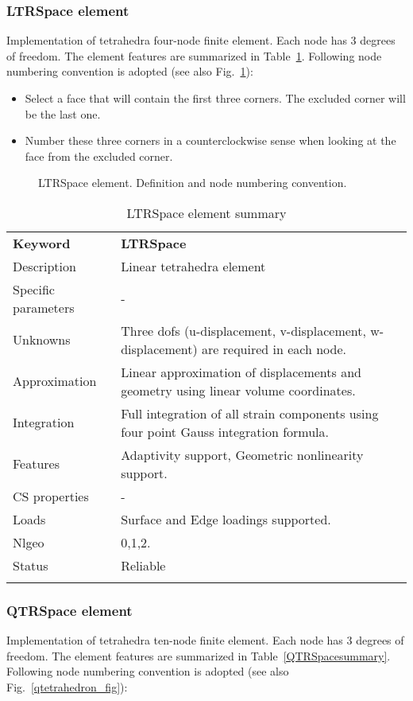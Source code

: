 \documentclass[a4paper]{article}
\newcommand{\param}[1]{\texttt{#1}} %
\newcommand{\templabel}{}%
\newcommand{\tempcaption}{}%
\newcounter{nelpar}
\newenvironment{elementsummary}[5]{%
  \gdef\tempcaption{#4}%
  \gdef\templabel{#5}%
  \setcounter{nelpar}{0}%
  \begin{center} %
    \begin{table}[!htb] %
      \begin{tabular}{|l|p{9cm}|}\hline %
        {\bf Keyword} & \bf{#1}\\ %
        {Description} & {#2}\\ %
        {Specific parameters} & {#3}\\ \hline %
}{
  \\ \hline %
      \end{tabular}%
      \caption{\tempcaption}%
      \label{\templabel}%
    \end{table}%
  \end{center}%
}
\newcommand{\elementParam}[1]{%
  \ifthenelse{\value{nelpar}>0} %
             {&{#1}}%
             {\setcounter{nelpar}{1}Parameters&{#1}}%
             \\%
}
\newcommand{\elementDescription}[2]{{#1} & {#2}\\ }
\begin{document}
\subsubsection{LTRSpace element}
Implementation of tetrahedra four-node finite element. 
Each node has 3 degrees of freedom. The element features are summarized in Table~\ref{LTRSpacesummary}.
Following node numbering convention is adopted (see also Fig.~\ref{lintetrahedron_fig}):
\begin{itemize}
\item Select a face that will contain the first three corners. The excluded corner will be the last one.
\item Number these three corners in a counterclockwise sense when looking at the face from the
      excluded corner.
\end{itemize}
 
\begin{figure}[htb]
 \centering
 \begin{makeimage}
  
 \end{makeimage}
 \caption{LTRSpace element. Definition and node numbering convention.}
 \label{lintetrahedron_fig}
\end{figure}

\begin{elementsummary}{LTRSpace}{Linear tetrahedra element}{-}{LTRSpace element summary}{LTRSpacesummary}
\elementDescription{Unknowns}{Three dofs (u-displacement, v-displacement, w-displacement) are required in each node.}
\elementDescription{Approximation}{ Linear approximation of displacements and geometry using linear volume coordinates.}
\elementDescription{Integration}{Full integration of all strain components using four point Gauss integration formula.}
\elementDescription{Features}{Adaptivity support, Geometric nonlinearity support.}
\elementDescription{CS properties}{-}
\elementDescription{Loads}{Surface and Edge loadings supported.}
\elementDescription{Nlgeo}{0,1,2.}
\elementDescription{Status}{Reliable}
\end{elementsummary}


\subsubsection{QTRSpace element}
Implementation of tetrahedra ten-node finite element. 
Each node has 3 degrees of freedom. The element features are summarized in Table~\ref{QTRSpacesummary}.
Following node numbering convention is adopted (see also Fig.~\ref{qtetrahedron_fig}):
\end{document}
